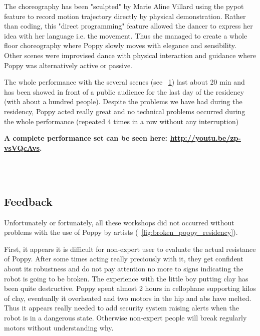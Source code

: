 The choreography has been "sculpted" by Marie Aline Villard using the pypot feature to record motion trajectory directly by physical demonstration. Rather than coding, this "direct programming" feature allowed the dancer to express her idea with her language i.e. the movement. Thus she managed to create a whole floor choreography where Poppy slowly moves with elegance and sensibility.
Other scenes were improvised dance with physical interaction and guidance where Poppy was alternatively active or passive.

The whole performance with the several scenes (see \figurename~\ref{fig:poppy_dance_performance}) last about 20 min and has been showed in front of a public audience for the last day of the residency (with about a hundred people). Despite the problems we have had during the residency, Poppy acted really great and no technical problems occurred during the whole performance (repeated 4 times in a row without any interruption)

\textbf{A complete performance set can be seen here: \url{http://youtu.be/zp-vsVQcAvs}.}

\begin{figure}[p]
\centering
    \hfil
    \\
    \hfil
    \\
    \caption{}
    \label{fig:poppy_dance_performance}
\end{figure}


\subsection{Feedback} %

Unfortunately or fortunately, all these workshops did not occurred without problems with the use of Poppy by artists (\figurename~\ref{fig:broken_poppy_residency}).

First, it appears it is difficult for non-expert user to evaluate the actual resistance of Poppy. After some times acting really preciously with it, they get confident about its robustness and do not pay attention no more to signs indicating the robot is going to be broken. The experience with the little boy putting clay has been quite destructive. Poppy spent almost 2 hours in cellophane supporting kilos of clay, eventually it overheated and two motors in the hip and abs have melted.
Thus it appears really needed to add security system raising alerts when the robot is in a dangerous state.  Otherwise non-expert people will break regularly motors without understanding why.


